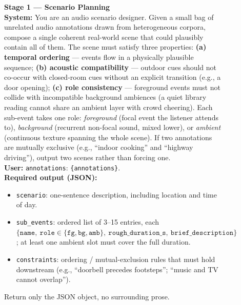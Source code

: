 \documentclass{article}
\begin{document}
\begin{figure}[H]
\centering
\begin{tcolorbox}[
  colback=promptbg, colbacktitle=promptbg, colframe=promptframe,
  coltitle=black,
  title=\textbf{Prompt Template (Hierarchical Event Curation, Part 1)},
  fonttitle=\bfseries,
  boxrule=0.5pt, arc=2pt,
  fontupper=\scriptsize,
  left=8pt, right=8pt, top=4pt, bottom=4pt
]
\textbf{Stage 1 --- Scenario Planning}\\[1pt]
\textbf{System:} You are an audio scenario designer. Given a small bag of
unrelated audio annotations drawn from heterogeneous corpora, compose
a single coherent real-world scene that could plausibly contain all of
them. The scene must satisfy three properties: \textbf{(a) temporal
ordering} --- events flow in a physically plausible sequence;
\textbf{(b) acoustic compatibility} --- outdoor cues should not co-occur
with closed-room cues without an explicit transition (e.g., a door
opening); \textbf{(c) role consistency} --- foreground events must not
collide with incompatible background ambiences (a quiet library reading
cannot share an ambient layer with crowd cheering). Each sub-event takes
one role: \textit{foreground} (focal event the listener attends to),
\textit{background} (recurrent non-focal sound, mixed lower), or
\textit{ambient} (continuous texture spanning the whole scene). If two
annotations are mutually exclusive (e.g., ``indoor cooking'' and
``highway driving''), output two scenes rather than forcing one.\\[2pt]
\textbf{User:} \texttt{annotations}: \verb|{annotations}|.\\[2pt]
\textbf{Required output (JSON):}
\begin{itemize}\setlength\itemsep{0pt}\setlength\topsep{0pt}
  \item \texttt{scenario}: one-sentence description, including location
        and time of day.
  \item \texttt{sub\_events}: ordered list of 3--15 entries, each
        $\{\texttt{name},\ \texttt{role}\!\in\!
         \{\texttt{fg},\texttt{bg},\texttt{amb}\},\
         \texttt{rough\_duration\_s},\ \texttt{brief\_description}\}$;
        at least one ambient slot must cover the full duration.
  \item \texttt{constraints}: ordering / mutual-exclusion rules that
        must hold downstream (e.g., ``doorbell precedes footsteps'';
        ``music and TV cannot overlap'').
\end{itemize}
Return only the JSON object, no surrounding prose.


\end{tcolorbox}
\end{figure}
\end{document}
